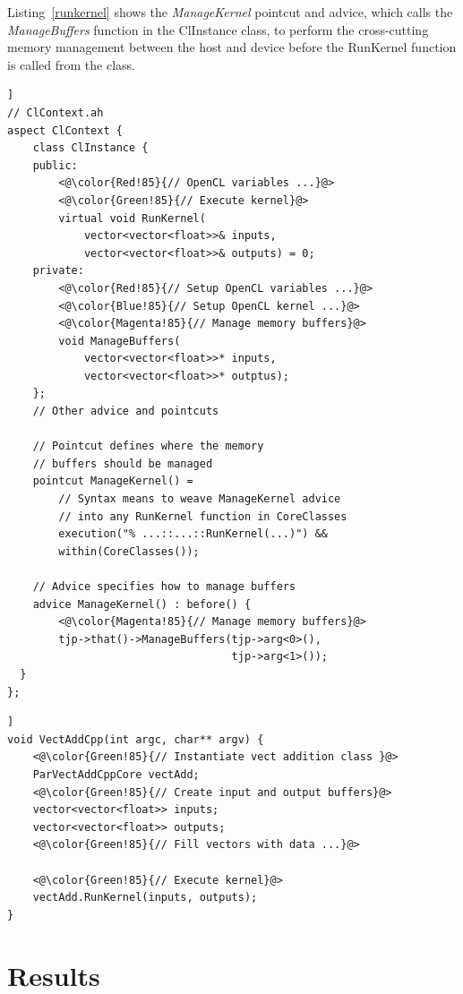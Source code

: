 \documentclass{sig-alternate-05-2015}
\begin{document}
Listing~\ref{runkernel} shows the \textit{ManageKernel} pointcut and advice,
which calls the \textit{ManageBuffers} function in the ClInstance
class, to perform the cross-cutting memory management between the host and
device before the RunKernel function is called from the \CPP
class.

\begin{lstlisting}[caption=Abstract aspect components which hide kernel
cross-cutting concerns.,label=runkernel,float=[!t]]
// ClContext.ah
aspect ClContext {
	class ClInstance {
	public:
		<@\color{Red!85}{// OpenCL variables ...}@>
		<@\color{Green!85}{// Execute kernel}@>
		virtual void RunKernel(
			vector<vector<float>>& inputs,
			vector<vector<float>>& outputs) = 0;
	private:
		<@\color{Red!85}{// Setup OpenCL variables ...}@>
		<@\color{Blue!85}{// Setup OpenCL kernel ...}@>
		<@\color{Magenta!85}{// Manage memory buffers}@>
		void ManageBuffers(
			vector<vector<float>>* inputs,
			vector<vector<float>>* outptus);
	};
	// Other advice and pointcuts 

	// Pointcut defines where the memory 
	// buffers should be managed
	pointcut ManageKernel() = 
		// Syntax means to weave ManageKernel advice 
		// into any RunKernel function in CoreClasses 
		execution("% ...::...::RunKernel(...)") &&
		within(CoreClasses());

	// Advice specifies how to manage buffers
	advice ManageKernel() : before() {
		<@\color{Magenta!85}{// Manage memory buffers}@>
		tjp->that()->ManageBuffers(tjp->arg<0>(),
								   tjp->arg<1>());
  }
};
\end{lstlisting}

\begin{lstlisting}[caption=Execution of a pallel kernel from a \CPP class.,label=crunkernel,float=[!t]]
void VectAddCpp(int argc, char** argv) {
	<@\color{Green!85}{// Instantiate vect addition class }@>
	ParVectAddCppCore vectAdd;
	<@\color{Green!85}{// Create input and output buffers}@>
	vector<vector<float>> inputs;
	vector<vector<float>> outputs;
	<@\color{Green!85}{// Fill vectors with data ...}@>
  
	<@\color{Green!85}{// Execute kernel}@>
	vectAdd.RunKernel(inputs, outputs);
}
\end{lstlisting}

\section{Results}\label{sec:results}
\end{document}
